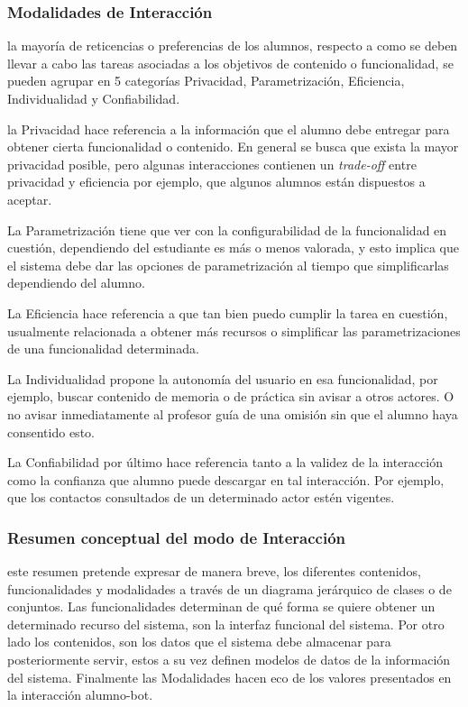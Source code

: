         \subsubsection{Modalidades de Interacción}
        \label{sssec:cualidades}
            \par la mayoría de reticencias o preferencias de los alumnos, respecto a como se deben llevar a cabo las tareas asociadas a los objetivos de contenido o funcionalidad, se pueden agrupar en 5 categorías Privacidad, Parametrización, Eficiencia, Individualidad y Confiabilidad.
            \par la Privacidad hace referencia a la información que el alumno debe entregar para obtener cierta funcionalidad o contenido. En general se busca que exista la mayor privacidad posible, pero algunas interacciones contienen un \textit{trade-off} entre privacidad y eficiencia por ejemplo, que algunos alumnos están dispuestos a aceptar.
            \par La Parametrización tiene que ver con la configurabilidad de la funcionalidad en cuestión, dependiendo del estudiante es más o menos valorada, y esto implica que el sistema debe dar las opciones de parametrización al tiempo que simplificarlas dependiendo del alumno.
            \par La Eficiencia hace referencia a que tan bien puedo cumplir la tarea en cuestión, usualmente relacionada a obtener más recursos o simplificar las parametrizaciones de una funcionalidad determinada.
            \par La Individualidad propone la autonomía del usuario en esa funcionalidad, por ejemplo, buscar contenido de memoria o de práctica sin avisar a otros actores. O no avisar inmediatamente al profesor guía de una omisión sin que el alumno haya consentido esto.
            \par La Confiabilidad por último hace referencia tanto a la validez de la interacción como la confianza que alumno puede descargar en tal interacción. Por ejemplo, que los contactos consultados de un determinado actor estén vigentes.
        
        \subsubsection{Resumen conceptual del modo de Interacción}

        \par este resumen pretende expresar de manera breve, los diferentes contenidos, funcionalidades y modalidades a través de un diagrama jerárquico de clases o de conjuntos. Las funcionalidades determinan de qué forma se quiere obtener un determinado recurso del sistema, son la interfaz funcional del sistema. Por otro lado los contenidos, son los datos que el sistema debe almacenar para posteriormente servir, estos a su vez definen modelos de datos de la información del sistema. Finalmente las Modalidades hacen eco de los valores presentados en la interacción alumno-bot.
        

